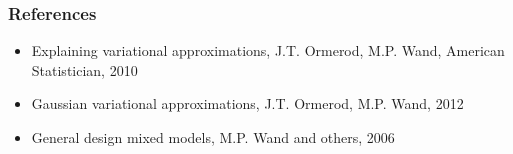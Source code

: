 \documentclass{beamer}
\begin{document}
\begin{frame}
\frametitle{References}
\begin{itemize}
\item Explaining variational approximations, J.T. Ormerod, M.P. Wand, American Statistician, 2010
\item Gaussian variational approximations, J.T. Ormerod, M.P. Wand, 2012
\item General design mixed models, M.P. Wand and others, 2006
\end{itemize}
\end{frame}
\end{document}
